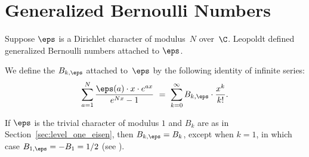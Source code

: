\section{Generalized Bernoulli Numbers}
Suppose $\eps$ is a Dirichlet character of modulus~$N$ over~$\C$.
Leopoldt \cite{leopoldt} defined generalized Bernoulli 
numbers attached to $\eps$.
\begin{definition}
We define the  $B_{k,\eps}$
attached to~$\eps$ by the following 
identity of infinite series:
$$
\sum_{a=1}^{N} \frac{\eps(a) \cdot x \cdot e^{ax}}{e^{Nx}-1}
                \,\, = \,\, 
\sum_{k=0}^{\infty} B_{k,\eps} \cdot \frac{x^k}{k!}.
$$
\end{definition}
If $\eps$ is the trivial character of modulus $1$ and $B_k$
are as in Section~\ref{sec:level_one_eisen}, then
$B_{k,\eps} = B_k$, except when $k=1$, in which case
$B_{1,\eps} = -B_1 = 1/2$ (see ).

